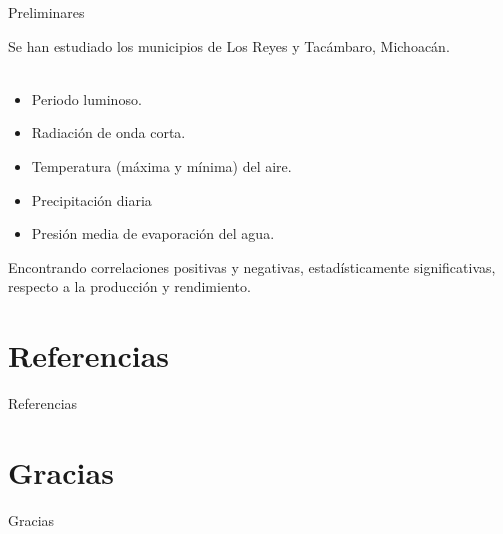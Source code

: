 \documentclass[aspectratio=169]{beamer}
\begin{document}
\begin{frame}{Preliminares}

\vspace{-1cm}\begin{block}{}
    Se han estudiado los municipios de Los Reyes y Tacámbaro, Michoacán.\\

\,\\

    \begin{minipage}{0.5\textwidth}
        \begin{itemize}
        \item Periodo luminoso.
        \item Radiación de onda corta.
        \item Temperatura (máxima y mínima) del aire.
    \end{itemize}
    \end{minipage}%
    \begin{minipage}{0.5\textwidth}
        \begin{itemize}
        \item Precipitación diaria
        \item Presión media de evaporación del agua.
    \end{itemize}
    \end{minipage}%
\end{block}

Encontrando correlaciones positivas y negativas, estadísticamente significativas, respecto a la producción y rendimiento.
\end{frame}

\section*{Referencias}
\begin{frame}{Referencias}
	\vspace*{-1cm}
	\tiny
	
	
	\nocite{*}
\end{frame}

\section*{Gracias}
\begin{frame}[noframenumbering]
     \begin{center}
	    \Huge{Gracias}
	\end{center}
    \end{frame}
\end{document}
